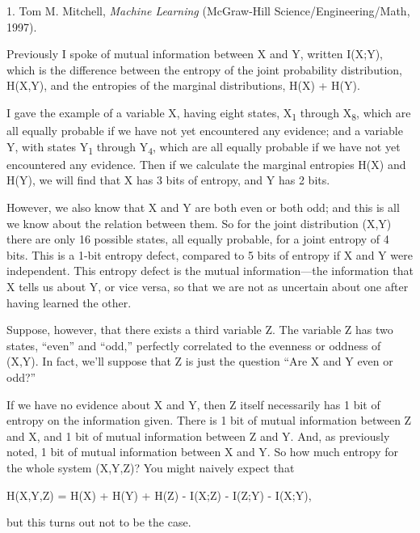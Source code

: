 \bigskip

{
 1. Tom M. Mitchell, \textit{Machine Learning} (McGraw-Hill
Science/Engineering/Math, 1997).}


{
 Previously I spoke of mutual information between X and Y, written
I(X;Y), which is the difference between the entropy of the joint
probability distribution, H(X,Y), and the entropies of the marginal
distributions, H(X) + H(Y). }

{
 I gave the example of a variable X, having eight states,
X\textsubscript{1} through X\textsubscript{8}, which are all equally
probable if we have not yet encountered any evidence; and a variable Y,
with states Y\textsubscript{1} through Y\textsubscript{4}, which are
all equally probable if we have not yet encountered any evidence. Then
if we calculate the marginal entropies H(X) and H(Y), we will find that
X has 3 bits of entropy, and Y has 2 bits.}

{
 However, we also know that X and Y are both even or both odd; and
this is all we know about the relation between them. So for the joint
distribution (X,Y) there are only 16 possible states, all equally
probable, for a joint entropy of 4 bits. This is a 1-bit entropy
defect, compared to 5 bits of entropy if X and Y were independent. This
entropy defect is the mutual information---the information that X tells
us about Y, or vice versa, so that we are not as uncertain about one
after having learned the other.}

{
 Suppose, however, that there exists a third variable Z. The
variable Z has two states, ``even''
and ``odd,'' perfectly correlated to
the evenness or oddness of (X,Y). In fact, we'll
suppose that Z is just the question ``Are X and Y even
or odd?''}

{
 If we have no evidence about X and Y, then Z itself necessarily
has 1 bit of entropy on the information given. There is 1 bit of mutual
information between Z and X, and 1 bit of mutual information between Z
and Y. And, as previously noted, 1 bit of mutual information between X
and Y. So how much entropy for the whole system (X,Y,Z)? You might
naively expect that}

{\centering
 H(X,Y,Z) = H(X) + H(Y) + H(Z) - I(X;Z) - I(Z;Y) - I(X;Y),
\par}


\bigskip

{
 but this turns out not to be the case. }

